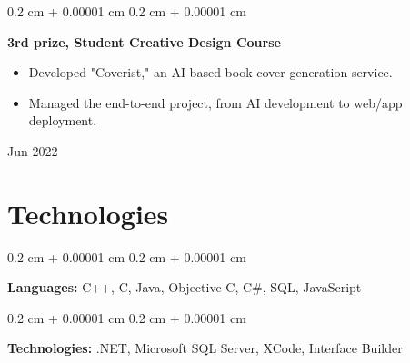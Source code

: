 \documentclass[10pt, letterpaper]{article}
\newenvironment{highlights}{
    \begin{itemize}[
        topsep=0.10 cm,
        parsep=0.10 cm,
        partopsep=0pt,
        itemsep=0pt,
        leftmargin=0.4 cm + 10pt
    ]
}{
    \end{itemize}
} %
\newenvironment{onecolentry}{
    \begin{adjustwidth}{
        0.2 cm + 0.00001 cm
    }{
        0.2 cm + 0.00001 cm
    }
}{
    \end{adjustwidth}
} %
\newenvironment{twocolentry}[2][]{
    \onecolentry
    \def\secondColumn{#2}
    \setcolumnwidth{\fill, 4.5 cm}
    \begin{paracol}{2}
}{
    \switchcolumn \raggedleft \secondColumn
    \end{paracol}
    \endonecolentry
} %
\begin{document}
            \vspace{0.2 cm}
        
            \begin{twocolentry}{
                Jun 2022
            }
                \textbf{3rd prize, Student Creative Design Course}
                \begin{highlights}
                    \item Developed "Coverist," an AI-based book cover generation service.
                    \item Managed the end-to-end project, from AI development to web/app deployment.
                \end{highlights}
            \end{twocolentry}


    
    \section{Technologies}



        
        \begin{onecolentry}
            \textbf{Languages:} C++, C, Java, Objective-C, C\#, SQL, JavaScript
        \end{onecolentry}

        \vspace{0.2 cm}

        \begin{onecolentry}
            \textbf{Technologies:} .NET, Microsoft SQL Server, XCode, Interface Builder
        \end{onecolentry}


    
\end{document}
